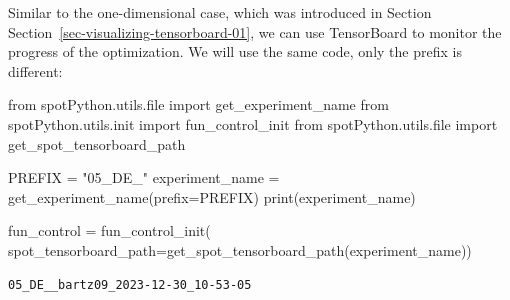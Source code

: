 \documentclass[
  letterpaper,
  DIV=11,
  numbers=noendperiod]{scrreprt}
\newenvironment{Shaded}{\begin{snugshade}}{\end{snugshade}}
\newcommand{\BuiltInTok}[1]{\textcolor[rgb]{0.00,0.23,0.31}{#1}}
\newcommand{\ImportTok}[1]{\textcolor[rgb]{0.00,0.46,0.62}{#1}}
\newcommand{\NormalTok}[1]{\textcolor[rgb]{0.00,0.23,0.31}{#1}}
\newcommand{\OperatorTok}[1]{\textcolor[rgb]{0.37,0.37,0.37}{#1}}
\newcommand{\StringTok}[1]{\textcolor[rgb]{0.13,0.47,0.30}{#1}}
\begin{document}
\begin{tcolorbox}[enhanced jigsaw, arc=.35mm, colback=white, bottomtitle=1mm, toprule=.15mm, coltitle=black, titlerule=0mm, leftrule=.75mm, title=\textcolor{quarto-callout-note-color}{\faInfo}\hspace{0.5em}{TensorBoard}, opacitybacktitle=0.6, breakable, colbacktitle=quarto-callout-note-color!10!white, opacityback=0, toptitle=1mm, rightrule=.15mm, left=2mm, colframe=quarto-callout-note-color-frame, bottomrule=.15mm]

Similar to the one-dimensional case, which was introduced in Section
Section~\ref{sec-visualizing-tensorboard-01}, we can use TensorBoard to
monitor the progress of the optimization. We will use the same code,
only the prefix is different:

\begin{Shaded}
\begin{Highlighting}[]
\ImportTok{from}\NormalTok{ spotPython.utils.}\BuiltInTok{file} \ImportTok{import}\NormalTok{ get\_experiment\_name}
\ImportTok{from}\NormalTok{ spotPython.utils.init }\ImportTok{import}\NormalTok{ fun\_control\_init}
\ImportTok{from}\NormalTok{ spotPython.utils.}\BuiltInTok{file} \ImportTok{import}\NormalTok{ get\_spot\_tensorboard\_path}

\NormalTok{PREFIX }\OperatorTok{=} \StringTok{"05\_DE\_"}
\NormalTok{experiment\_name }\OperatorTok{=}\NormalTok{ get\_experiment\_name(prefix}\OperatorTok{=}\NormalTok{PREFIX)}
\BuiltInTok{print}\NormalTok{(experiment\_name)}

\NormalTok{fun\_control }\OperatorTok{=}\NormalTok{ fun\_control\_init(}
\NormalTok{    spot\_tensorboard\_path}\OperatorTok{=}\NormalTok{get\_spot\_tensorboard\_path(experiment\_name))}
\end{Highlighting}
\end{Shaded}

\begin{verbatim}
05_DE__bartz09_2023-12-30_10-53-05
\end{verbatim}

\end{tcolorbox}
\end{document}
